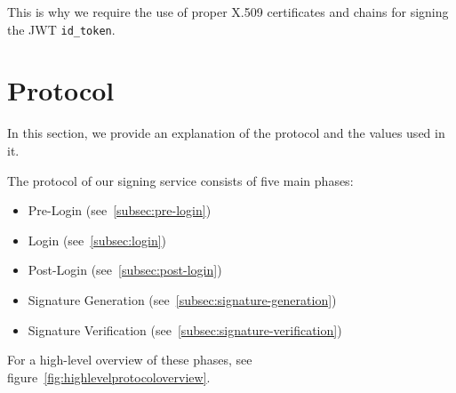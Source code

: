 This is why we require the use of proper X.509 certificates and chains for signing the \gls{JWT} \texttt{id\_token}.





\section{Protocol}\label{sec:protocol}

In this section, we provide an explanation of the protocol and the values used in it.

The protocol of our signing service consists of five main phases:

\begin{itemize}
    \item Pre-Login (see~\ref{subsec:pre-login})
    \item Login (see~\ref{subsec:login})
    \item Post-Login (see~\ref{subsec:post-login})
    \item Signature Generation (see~\ref{subsec:signature-generation})
    \item Signature Verification (see~\ref{subsec:signature-verification})
\end{itemize}

For a high-level overview of these phases, see figure~\ref{fig:highlevelprotocoloverview}.

